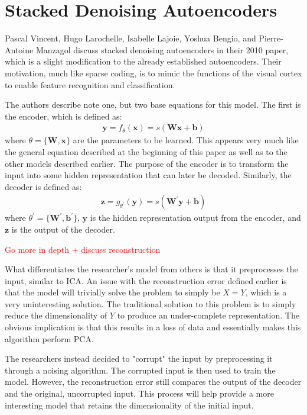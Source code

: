 \documentclass{article}
\newcommand{\vect}[1]{\mathbf{#1}}
\newcommand{\matr}[1]{\mathbf{#1}}
\newcommand{\vb}[0]{\vect{b}}
\newcommand{\vx}[0]{\vect{x}}
\newcommand{\vz}[0]{\vect{z}}
\newcommand{\vy}[0]{\vect{y}}
\newcommand{\mW}[0]{\matr{W}}
\newcommand{\todo}[1]{{\Large\textcolor{red}{#1}}}
\begin{document}
\section {Stacked Denoising Autoencoders}

Pascal Vincent, Hugo Larochelle, Isabelle Lajoie, Yoshua Bengio, and Pierre-Antoine Manzagol discuss stacked denoising autoencoders in their 2010 paper, which is a slight modification to the already established autoencoders. Their motivation, much like sparse coding, is to mimic the functions of the visual cortex to enable feature recognition and classification. 

The authors describe note one, but two base equations for this model. The first is the encoder, which is defined as:
\begin{align*}
\vy = f_\theta (\vx) = s(\mW \vx + \vb)
\end{align*}
where $\theta = \{ \mW, \vx \}$ are the parameters to be learned. This appears very much like the general equation described at the beginning of this paper as well as to the other models described earlier. The purpose of the encoder is to transform the input into some hidden representation that can later be decoded. Similarly, the decoder is defined as:
\begin{align*}
\vz = g_{\theta^{'}} (\vy) = s(\mW^{'}  \vy + \vb)
\end{align*}
where $\theta^{'} = \{ \mW^{'}, \vb^{'} \}$, $\vy$ is the hidden representation output from the encoder, and $\vz$ is the output of the decoder. 

\todo {Go more in depth + discuss reconstruction}

What differentiates the researcher's model from others is that it preprocesses the input, similar to ICA. An issue with the reconstruction error defined earlier is that the model will trivially solve the problem to simply be $X = Y$, which is a very uninteresting solution. The traditional solution to this problem is to simply reduce the dimensionality of $Y$ to produce an under-complete representation. The obvious implication is that this results in a loss of data and essentially makes this algorithm perform PCA.

The researchers instead decided to "corrupt" the input by preprocessing it through a noising algorithm. The corrupted input is then used to train the model. However, the reconstruction error still compares the output of the decoder and the original, uncorrupted input. This process will help provide a more interesting model that retains the dimensionality of the initial input. 
\end{document}
